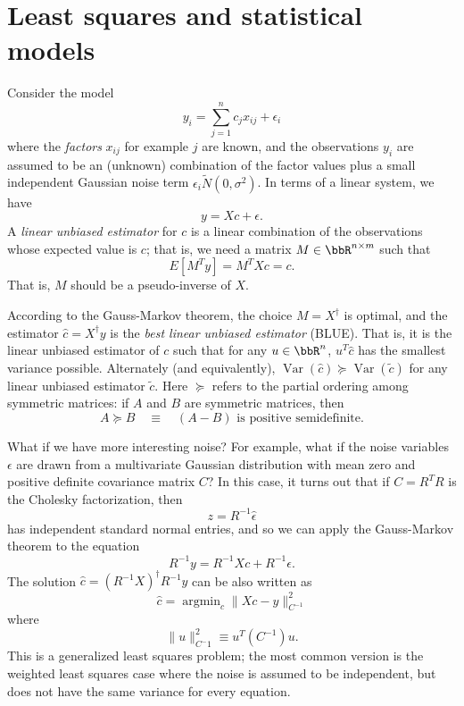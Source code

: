 \section{Least squares and statistical models}

Consider the model
\[
  y_i = \sum_{j=1}^n c_j x_{ij} + \epsilon_i
\]
where the {\em factors} $x_{ij}$ for example $j$ are known,
and the observations $y_i$ are assumed to be an (unknown)
combination of the factor values plus a small independent
Gaussian noise term $\epsilon_i \tilde N(0,\sigma^2)$.
In terms of a linear system, we have
\[
  y = X c + \epsilon.
\]
A {\em linear unbiased estimator} for $c$ is a linear combination
of the observations whose expected value is $c$; that is, we
need a matrix $M \in \bbR^{n \times m}$ such that
\[
  E[M^T y] = M^T X c = c.
\]
That is, $M$ should be a pseudo-inverse of $X$.

According to the Gauss-Markov theorem, the choice $M = X^\dagger$
is optimal, and the estimator $\hat{c} = X^\dagger y$
is the {\em best linear unbiased estimator} (BLUE).  That is,
it is the linear unbiased estimator of $c$ such that for any
$u \in \bbR^n$,  $u^T \hat{c}$ has the smallest variance possible.
Alternately (and equivalently),
$\operatorname{Var}(\hat{c}) \succeq \operatorname{Var}(\tilde{c})$
for any linear unbiased estimator $\tilde{c}$.  Here $\succeq$ refers
to the partial ordering among symmetric matrices: if $A$ and $B$
are symmetric matrices, then
\[
  A \succeq B \quad \equiv \quad (A-B) \mbox{ is positive semidefinite}.
\]

What if we have more interesting noise?  For example, what if the
noise variables $\epsilon$ are drawn from a multivariate Gaussian
distribution with mean zero and positive definite covariance matrix $C$?
In this case, it turns out that if $C = R^T R$ is the
Cholesky factorization, then
\[
  z = R^{-1} \hat{\epsilon}
\]
has independent standard normal entries, and so we can apply
the Gauss-Markov theorem to the equation
\[
  R^{-1} y = R^{-1} X c + R^{-1} \epsilon.
\]
The solution $\hat{c} = (R^{-1} X)^{\dagger} R^{-1} y$ can be also
written as
\[
  \hat{c} = \operatorname{argmin}_c \|Xc-y\|^2_{C^{-1}}
\]
where
\[
  \|u\|_{C^-1}^2 \equiv u^T (C^{-1}) u.
\]
This is a generalized least squares problem; the most common version
is the weighted least squares case where the noise is assumed to
be independent, but does not have the same variance for every equation.
